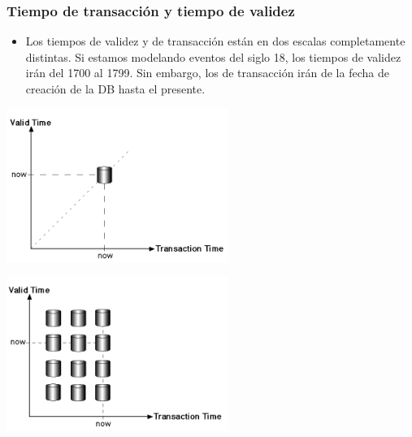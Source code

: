 \begin{frame}
\frametitle{Tiempo de transacción y tiempo de validez}
	\begin{itemize}
	\item	Los tiempos de validez y de transacción están en dos escalas
		completamente distintas. \pause
		Si estamos modelando eventos del siglo 18, los tiempos de validez
		irán del 1700 al 1799. \pause
		Sin embargo, los de transacción irán de la fecha de creación
		de la DB hasta el presente.
	\end{itemize}
\end{frame}

\begin{frame}
	\begin{center}
	\includegraphics[height=5cm]{snapshot.png}
	\end{center}
\end{frame}

\begin{frame}
	\begin{center}
	\includegraphics[height=5cm]{bitemporal.png}
	\end{center}
\end{frame}


